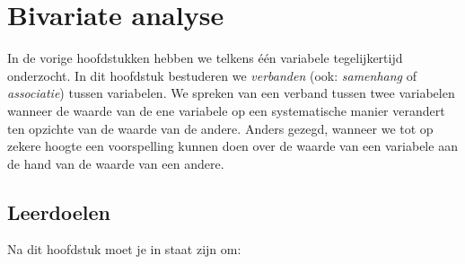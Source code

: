 \chapter{Bivariate analyse}
\label{ch:analyse2var}

In de vorige hoofdstukken hebben we telkens één variabele tegelijkertijd onderzocht. In dit hoofdstuk bestuderen we \emph{verbanden} (ook: \emph{samenhang} of \emph{associatie}) tussen variabelen. We spreken van een verband tussen twee variabelen wanneer de waarde van de ene variabele op een systematische manier verandert ten opzichte van de waarde van de andere. Anders gezegd, wanneer we tot op zekere hoogte een voorspelling kunnen doen over de waarde van een variabele aan de hand van de waarde van een andere.

\section{Leerdoelen}
\label{sec:analyse2var-leerdoelen}

Na dit hoofdstuk moet je in staat zijn om:

